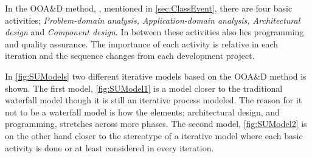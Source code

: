 In the OOA\&D method, \cite{Rod-Aalborg}, mentioned in \cref{sec:ClassEvent},  there are four basic activities; \textit{Problem-domain analysis, Application-domain analysis, Architectural design} and \textit{Component design}.
In between these activities  also lies programming and quality assurance.
The importance of each activity is relative in each iteration and the sequence changes from each development project.


In \cref{fig:SUModels} two different iterative models based on the OOA\&D method is shown.
The first model, \cref{fig:SUModel1} is a model closer to the traditional waterfall model though it is still an iterative process modeled.
The reason for it not to be a waterfall model is how the elements; architectural design, and programming, stretches across more phases.
The second model, \cref{fig:SUModel2} is on the other hand closer to the stereotype of a iterative model where each basic activity is done or at least considered in every iteration. 

